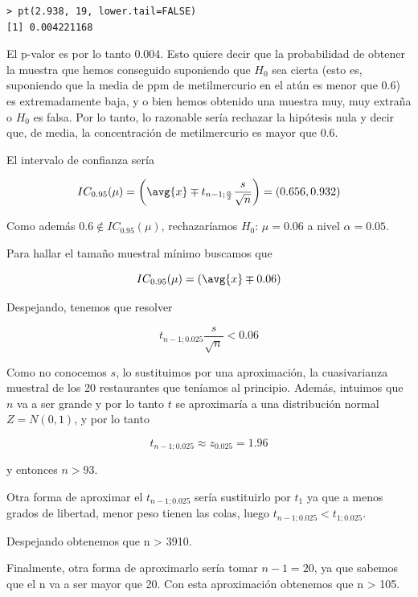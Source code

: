 \begin{problem}[1]
\begin{verbatim}
> pt(2.938, 19, lower.tail=FALSE)
[1] 0.004221168
\end{verbatim}

El p-valor es por lo tanto $0.004$. Esto quiere decir que la probabilidad de obtener la muestra que hemos conseguido suponiendo que $H_0$ sea cierta (esto es, suponiendo que la media de ppm de metilmercurio en el atún es menor que $0.6$) es extremadamente baja, y o bien hemos obtenido una muestra muy, muy extraña o $H_0$ es falsa. Por lo tanto, lo razonable sería rechazar la hipótesis nula y decir que, de media, la concentración de metilmercurio es mayor que $0.6$.

\spart El intervalo de confianza sería 

\[ IC_{0.95} (\mu) = \left(\avg{x} \mp t_{n-1;\frac{\alpha}{2}}\frac{s}{\sqrt{n}} \right) = (0.656, 0.932) \]

Como además $0.6\notin IC_{0.95}(\mu)$, rechazaríamos $H_0:\,\mu=0.06$ a nivel $\alpha=0.05$.

Para hallar el tamaño muestral mínimo buscamos que 

\[ IC_{0.95}(\mu) = (\avg{x} \mp 0.06)\]

Despejando, tenemos que resolver

\[ t_{n-1;0.025}\frac{s}{\sqrt{n}} < 0.06\]

Como no conocemos $s$, lo sustituimos por una aproximación, la cuasivarianza muestral de los 20 restaurantes que teníamos al principio. Además, intuimos que $n$ va a ser grande y por lo tanto $t$ se aproximaría a una distribución normal $Z = N(0,1)$, y por lo tanto

\[ t_{n-1;0.025} \approx z_{0.025} = 1.96 \]

y entonces $n > 93$.

Otra forma de aproximar el $t_{n-1; 0.025}$ sería sustituirlo por $t_1$ ya que a menos grados de libertad, menor peso tienen las colas, luego $t_{n-1; 0.025} < t_{1; 0.025}$.

Despejando obtenemos que n > 3910.

Finalmente, otra forma de aproximarlo sería tomar $n - 1 = 20$, ya que sabemos que el n va a ser mayor que 20. Con esta aproximación obtenemos que n > 105.
\end{problem}


